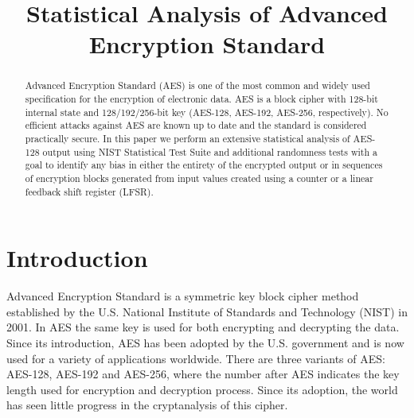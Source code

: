 \documentclass[conference]{IEEEtran}
\begin{document}
\title{Statistical Analysis of Advanced Encryption Standard}
\author{
\and
{}
\and
{}
\and
{}
}

\maketitle

\begin{abstract}
Advanced Encryption Standard (AES) is one of the most common and widely used specification for the encryption of electronic data. AES is a block cipher with 128-bit internal state and 128/192/256-bit key (AES-128, AES-192, AES-256, respectively). No efficient attacks against AES are known up to date and the standard is considered practically secure. In this paper we perform an extensive statistical analysis of AES-128 output using NIST Statistical Test Suite and additional randomness tests with a goal to identify any bias in either the entirety of the encrypted output or in sequences of encryption blocks generated from input values created using a counter or a linear feedback shift register (LFSR). 
\end{abstract}

\IEEEpeerreviewmaketitle

\section{Introduction}

Advanced Encryption Standard is a symmetric key block cipher method established by the U.S. National Institute of Standards and Technology (NIST) in 2001. In AES the same key is used for both encrypting and decrypting the data. Since its introduction, AES has been adopted by the U.S. government and is now used for a variety of applications worldwide. There are three variants of AES: AES-128, AES-192 and AES-256, where the number after AES
indicates the key length used for encryption and decryption process. Since its adoption, the world has seen little progress in the cryptanalysis of this cipher.
\end{document}
